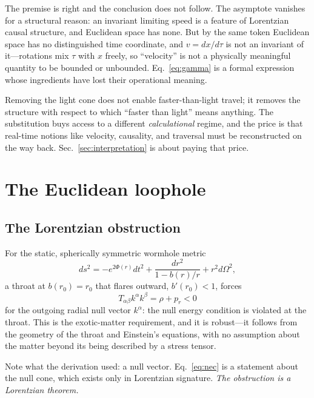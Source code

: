 \documentclass[twocolumn,floatfix,aps,prd,nofootinbib]{revtex4-2}
\begin{document}
The premise is right and the conclusion does not follow. The asymptote vanishes for a structural reason: an invariant limiting speed is a feature of Lorentzian causal structure, and Euclidean space has none. But by the same token Euclidean space has no distinguished time coordinate, and $v=dx/d\tau$ is not an invariant of it---rotations mix $\tau$ with $x$ freely, so ``velocity'' is not a physically meaningful quantity to be bounded or unbounded. Eq.~\eqref{eq:gamma} is a formal expression whose ingredients have lost their operational meaning.

Removing the light cone does not enable faster-than-light travel; it removes the structure with respect to which ``faster than light'' means anything. The substitution buys access to a different \emph{calculational} regime, and the price is that real-time notions like velocity, causality, and traversal must be reconstructed on the way back. Sec.~\ref{sec:interpretation} is about paying that price.

\section{The Euclidean loophole}
\label{sec:euclidean}

\subsection{The Lorentzian obstruction}

For the static, spherically symmetric wormhole metric~\cite{morris_thorne1988}
\begin{equation}
ds^2=-e^{2\Phi(r)}dt^2+\frac{dr^2}{1-b(r)/r}+r^2d\Omega^2 ,
\end{equation}
a throat at $b(r_0)=r_0$ that flares outward, $b'(r_0)<1$, forces
\begin{equation}
T_{\alpha\beta}k^\alpha k^\beta=\rho+p_r<0
\label{eq:nec}
\end{equation}
for the outgoing radial null vector $k^\alpha$: the null energy condition is violated at the throat. This is the exotic-matter requirement, and it is robust---it follows from the geometry of the throat and Einstein's equations, with no assumption about the matter beyond its being described by a stress tensor.

Note what the derivation used: a null vector. Eq.~\eqref{eq:nec} is a statement about the null cone, which exists only in Lorentzian signature. \emph{The obstruction is a Lorentzian theorem.}
\end{document}
